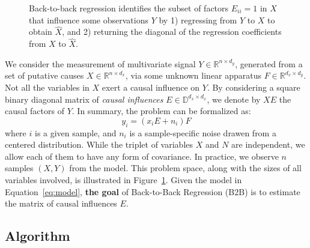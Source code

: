 \documentclass{article}
\begin{document}
\begin{figure}[t!]
    \caption{Back-to-back regression identifies the subset of factors $E_{ii} = 1$ in $X$ that influence some observations $Y$ by 1) regressing from $Y$ to $X$ to obtain $\hat{X}$, and 2) returning the diagonal of the regression coefficients from $X$ to $\hat{X}$.}
    \label{fig:b2b}
\end{figure}

We consider the measurement of multivariate signal $Y \in \mathbb{R}^{n \times d_y}$, generated from a set of putative causes $X \in \mathbb{R}^{n \times d_x}$, via some unknown linear apparatus $F \in \mathbb{R}^{d_x \times d_y}$.
%
Not all the variables in $X$ exert a causal influence on $Y$.
%
By considering a square binary diagonal matrix of \emph{causal influences} $E \in \mathbb{D}^{d_x \times d_x}$, we denote by $XE$ the causal factors of $Y$.
%
In summary, the problem can be formalized as:
%
\begin{equation}
    y_i = (x_i E + n_i) F
    \label{eq:model}
\end{equation}
%
where $i$ is a given sample, and $n_i$ is a sample-specific noise drawen from a centered distribution.
%
While the triplet of variables $X$ and $N$ are independent, we allow each of them to have any form of covariance.
%
In practice, we observe $n$ samples $(X, Y)$ from the model.
%
This problem space, along with the sizes of all variables involved, is illustrated in Figure~\ref{fig:b2b}.
%
Given the model in Equation~\eqref{eq:model}, \textbf{the goal} of Back-to-Back Regression (B2B) is to estimate the matrix of causal influences $E$.

\subsection{Algorithm}
\end{document}
